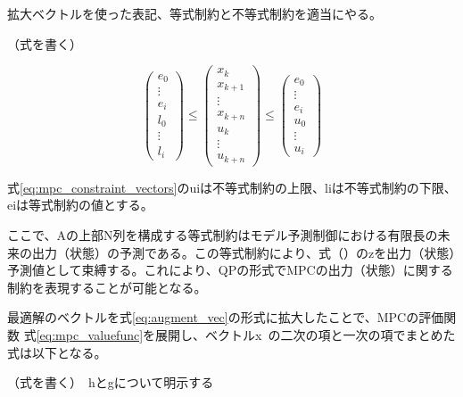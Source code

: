 

拡大ベクトルを使った表記、等式制約と不等式制約を適当にやる。

（式を書く）

\begin{equation}
  \begin{pmatrix}
    e_{0}\\
    \vdots \\
    e_{i}\\
    l_{0}\\
    \vdots\\
    l_{i}
  \end{pmatrix}
  \leq
  \begin{pmatrix}
    x_{k} \\ x_{k+1} \\ \vdots \\ x_{k+n}
    \\
    u_{k} \\ \vdots \\ u_{k+n}
  \end{pmatrix}
  \leq
  \begin{pmatrix}
    e_{0}\\
    \vdots\\
    e_{i}\\
    u_{0}\\
    \vdots\\
    u_{i}
  \end{pmatrix}
\end{equation}

式\eqref{eq:mpc_constraint_vectors}のuiは不等式制約の上限、liは不等式制約の下限、eiは等式制約の値とする。

ここで、Aの上部N列を構成する等式制約はモデル予測制御における有限長の未来の出力（状態）の予測である。この等式制約により、式（）のzを出力（状態）予測値として束縛する。これにより、QPの形式でMPCの出力（状態）に関する制約を表現することが可能となる。

最適解のベクトルを式\eqref{eq:augment_vec}の形式に拡大したことで、MPCの評価関数 式\eqref{eq:mpc_valuefunc}を展開し、ベクトルx~の二次の項と一次の項でまとめた式は以下となる。

（式を書く）　hとgについて明示する
